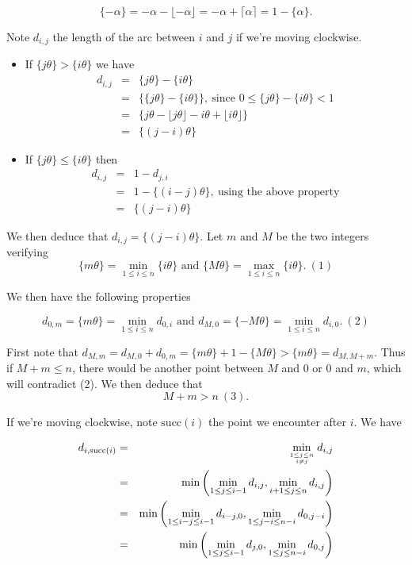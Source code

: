 \documentclass[a4paper,12pt]{article}
\begin{document}
\[ \{-\alpha\} = - \alpha - \lfloor -\alpha\rfloor= - \alpha + \lceil \alpha
\rceil = 1 - \{\alpha\}.\]

Note $d_{i,j}$ the length of the arc between $i$ and $j$ if we're moving
clockwise.
\begin{itemize}
\item If $\{j\theta\} > \{i\theta\}$ we have
  \begin{eqnarray*}
    d_{i,j} &=& \{j\theta\} - \{i\theta\} \\
    &=& \{ \{j\theta\} - \{i\theta\}\},\ \mbox{since $0 \le
      \{j\theta\} - \{i\theta\} < 1$} \\
    &=& \{ j\theta - \lfloor j\theta\rfloor - i\theta + \lfloor
    i\theta\rfloor\} \\
    &=& \{ (j-i)\theta\}
  \end{eqnarray*}

\item If $\{j\theta\} \le \{i\theta\}$ then
  \begin{eqnarray*}
    d_{i,j} &=& 1 - d_{j,i} \\
    &=& 1 - \{(i-j)\theta\},\ \mbox{using the above property} \\
    &=& \{(j-i)\theta\}
  \end{eqnarray*}
\end{itemize}

We then deduce that $d_{i,j} = \{(j-i)\theta\}$.  Let $m$ and $M$ be
the two integers verifying
\[ \{m\theta\} = \min_{1\le i\le n}\{i\theta\}\mbox{ and } \{M\theta\}
= \max_{1\le i\le n}\{i\theta\}.\ (1)\]

We then have the following properties

\[ d_{0,m} = \{m\theta\} = \min_{1\le i\le n}d_{0,i}\mbox{ and }
d_{M,0} = \{-M\theta\} = \min_{1\le i\le n}d_{i,0}.\ (2)\]

First note that $d_{M,m} = d_{M,0} + d_{0,m} = \{m\theta\} + 1 -
\{M\theta\} > \{m\theta\} = d_{M, M+m}$.  Thus if $M+m \le n$, there
would be another point between $M$ and $0$ or $0$ and $m$, which will
contradict (2).  We then deduce that
\[M+m > n\ (3).\]

If we're moving clockwise, note $\mathrm{succ}(i)$ the point we
encounter after $i$.  We have

\begin{eqnarray*}
  d_{i,\mathrm{succ}(i)} &=& \min_{1\le j\le n\atop i\not= j}d_{i,j}\\
  &=& \min\left( \min_{1\le j\le i-1}d_{i,j}, \min_{i+1\le j\le
    n}d_{i,j}\right) \\
  &=& \min\left( \min_{1\le i-j\le i-1}d_{i-j,0}, \min_{1\le j-i\le
    n-i}d_{0,j-i}\right) \\
  &=& \min\left( \min_{1\le j\le i-1}d_{j,0}, \min_{1\le j\le
    n-i}d_{0,j}\right)
\end{eqnarray*}
\end{document}
